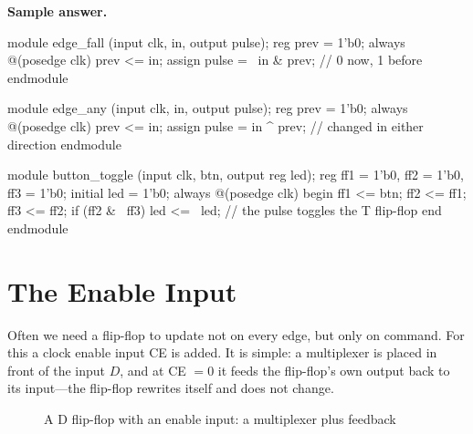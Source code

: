 \textbf{Sample answer.}
\begin{vcode}
module edge_fall (input clk, in, output pulse);
    reg prev = 1'b0;
    always @(posedge clk) prev <= in;
    assign pulse = ~in & prev;       // 0 now, 1 before
endmodule

module edge_any (input clk, in, output pulse);
    reg prev = 1'b0;
    always @(posedge clk) prev <= in;
    assign pulse = in ^ prev;        // changed in either direction
endmodule

module button_toggle (input clk, btn, output reg led);
    reg ff1 = 1'b0, ff2 = 1'b0, ff3 = 1'b0;
    initial led = 1'b0;
    always @(posedge clk) begin
        ff1 <= btn; ff2 <= ff1; ff3 <= ff2;
        if (ff2 & ~ff3) led <= ~led;   // the pulse toggles the T flip-flop
    end
endmodule
\end{vcode}

\section{The Enable Input}

Often we need a flip-flop to update not on every edge, but only on command. For
this a clock enable input CE is added. It is simple: a multiplexer is placed in
front of the input $D$, and at CE $=0$ it feeds the flip-flop's own output back
to its input---the flip-flop rewrites itself and does not change.

\begin{figure}[H]
\centering
{}
\caption{A D flip-flop with an enable input: a multiplexer plus feedback}
\label{fig:ce}
\end{figure}

